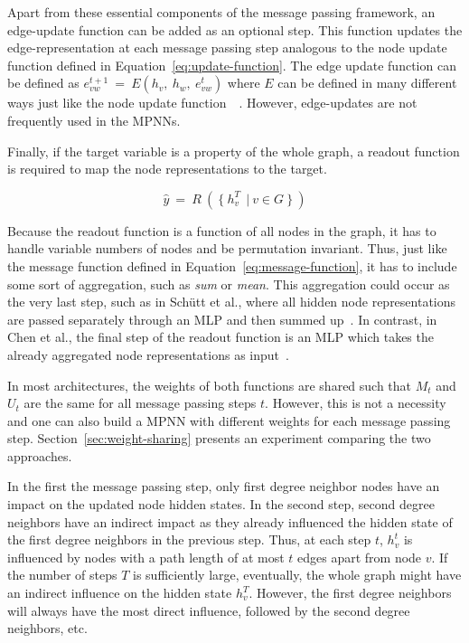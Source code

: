 Apart from these essential components of the message passing framework, an edge-update function can be added as an optional step. This function updates the edge-representation at each message passing step analogous to the node update function defined in Equation~\ref{eq:update-function}. The edge update function can be defined as $e_{vw}^{t+1} ~=~ E(h_v,~ h_w,~ e_{vw}^{t})$ where $E$ can be defined in many different ways just like the node update function~\cite{Kearnes2016}~\cite{Jørgensen2018}. However, edge-updates are not frequently used in the MPNNs.

Finally, if the target variable is a property of the whole graph, a readout function is required to map the node representations to the target.

\begin{equation}\label{eq:readout-function}
	\hat{y} ~=~ R~(~\{~h_v^T\ ~|~ v \in G~\}~)
\end{equation}


Because the readout function is a function of all nodes in the graph, it has to handle variable numbers of nodes and be permutation invariant. Thus, just like the message function defined in Equation~\ref{eq:message-function}, it has to include some sort of aggregation, such as \textit{sum} or \textit{mean}. This aggregation could occur as the very last step, such as in Schütt et al., where all hidden node representations are passed separately through an MLP and then summed up~\cite{Schutt2017}. In contrast, in Chen et al., the final step of the readout function is an MLP which takes the already aggregated node representations as input~\cite{Chen2019}.

In most architectures, the weights of both functions are shared such that $M_t$ and $U_t$ are the same for all message passing steps $t$. However, this is not a necessity and one can also build a MPNN with different weights for each message passing step. Section~\ref{sec:weight-sharing} presents an experiment comparing the two approaches.

In the first the message passing step, only first degree neighbor nodes have an impact on the updated node hidden states. In the second step, second degree neighbors have an indirect impact as they already influenced the hidden state of the first degree neighbors in the previous step. Thus, at each step $t$, $h_v^t$ is influenced by nodes with a path length of at most $t$ edges apart from node $v$. If the number of steps $T$ is sufficiently large, eventually, the whole graph might have an indirect influence on the hidden state $h_v^T$. However, the first degree neighbors will always have the most direct influence, followed by the second degree neighbors, etc.

